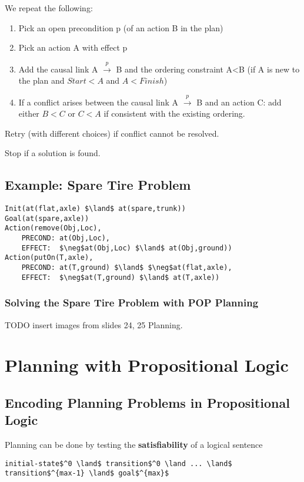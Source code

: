 We repeat the following:
\begin{enumerate}
    \item Pick an open precondition p (of an action B in the plan)
    \item Pick an action A with effect p
    \item Add the causal link A $\xrightarrow{p}$ B and the ordering constraint
        A<B (if A is new to the plan and $Start<A$ and $A<Finish$)
    \item If a conflict arises between the causal link A $\xrightarrow{p}$ B
        and an action C: add either $B<C$ or $C<A$ if consistent with the
        existing ordering.
\end{enumerate}

Retry (with different choices) if conflict cannot be resolved.

Stop if a solution is found.

\subsection{Example: Spare Tire Problem}
\begin{lstlisting}[morekeywords={Init,Goal,Action}]
Init(at(flat,axle) $\land$ at(spare,trunk))
Goal(at(spare,axle))
Action(remove(Obj,Loc),
    PRECOND: at(Obj,Loc),
    EFFECT:  $\neg$at(Obj,Loc) $\land$ at(Obj,ground))
Action(putOn(T,axle),
    PRECOND: at(T,ground) $\land$ $\neg$at(flat,axle),
    EFFECT:  $\neg$at(T,ground) $\land$ at(T,axle))
\end{lstlisting}

\subsubsection{Solving the Spare Tire Problem with POP Planning}
TODO insert images from slides 24, 25 Planning.

\section{Planning with Propositional Logic}
\subsection{Encoding Planning Problems in Propositional Logic}
Planning can be done by testing the \textbf{satisfiability} of a logical
sentence
\begin{lstlisting}
initial-state$^0 \land$ transition$^0 \land ... \land$ transition$^{max-1} \land$ goal$^{max}$
\end{lstlisting}

